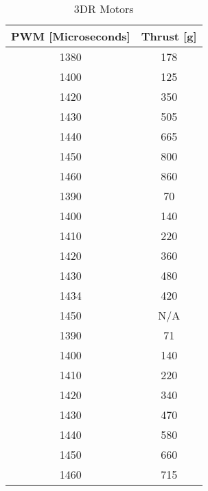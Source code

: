 \newpage
\begin {table}[H]
    \begin{center}
    \caption {3DR Motors} 
    \label{tab:tabt2} 
    \begin{tabular}{|c|c|}\hline 
\textbf{PWM [Microseconds]} & \textbf{Thrust [g]}\\
\hline 
1380 & 178 \\
1400 & 125 \\
1420 & 350 \\
1430 & 505 \\
1440 & 665 \\
1450 & 800 \\
1460 & 860 \\
1390 & 70 \\
1400 & 140 \\
1410 & 220 \\
1420 & 360 \\
1430 & 480 \\
1434 & 420 \\
1450 & N/A \\
1390 & 71 \\
1400 & 140 \\
1410 & 220 \\
1420 & 340 \\
1430 & 470 \\
1440 & 580 \\
1450 & 660 \\
1460 & 715 \\
        \hline 
    \end{tabular}
    \end{center}
\end{table}



\clearpage 

% 


\newpage

% 

% 

% 

% 



